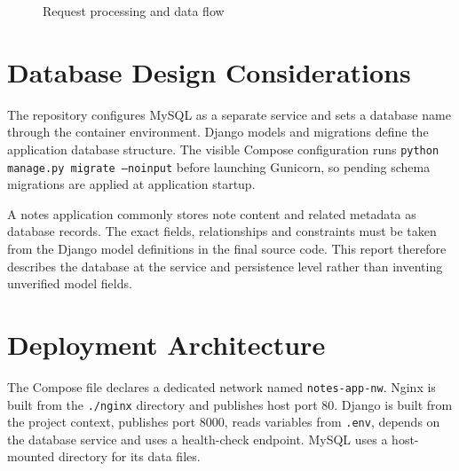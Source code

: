 \documentclass[12pt,a4paper,oneside]{report}
\begin{document}
\begin{figure}[H]
\centering
{}
\caption{Request processing and data flow}
\label{fig:dataflow}
\end{figure}

\section{Database Design Considerations}
The repository configures MySQL as a separate service and sets a database name through the container environment. Django models and migrations define the application database structure. The visible Compose configuration runs \texttt{python manage.py migrate --noinput} before launching Gunicorn, so pending schema migrations are applied at application startup.

A notes application commonly stores note content and related metadata as database records. The exact fields, relationships and constraints must be taken from the Django model definitions in the final source code. This report therefore describes the database at the service and persistence level rather than inventing unverified model fields.

\section{Deployment Architecture}
The Compose file declares a dedicated network named \texttt{notes-app-nw}. Nginx is built from the \texttt{./nginx} directory and publishes host port 80. Django is built from the project context, publishes port 8000, reads variables from \texttt{.env}, depends on the database service and uses a health-check endpoint. MySQL uses a host-mounted directory for its data files.
\end{document}
